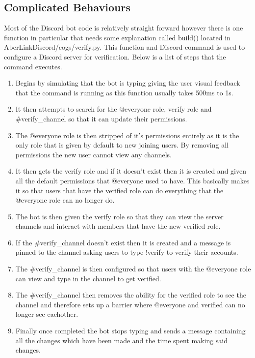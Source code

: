 \subsection{Complicated Behaviours}
Most of the Discord bot code is relatively straight forward however there is one function in particular that needs some explanation called build() located in AberLinkDiscord/cogs/verify.py. This function and Discord command is used to configure a Discord server for verification. Below is a list of steps that the command executes.

\begin{enumerate}
	\item Begins by simulating that the bot is typing giving the user visual feedback that the command is running as this function usually takes 500ms to 1s.
	\item It then attempts to search for the @everyone role, verify role and \#verify\_channel so that it can update their permissions.
	\item The @everyone role is then stripped of it's permissions entirely as it is the only role that is given by default to new joining users. By removing all permissions the new user cannot view any channels.
	\item It then gets the verify role and if it doesn't exist then it is created and given all the default permissions that @everyone used to have. This basically makes it so that users that have the verified role can do everything that the @everyone role can no longer do.
	\item The bot is then given the verify role so that they can view the server channels and interact with members that have the new verified role.
	\item If the \#verify\_channel doesn't exist then it is created and a message is pinned to the channel asking users to type !verify to verify their accounts.
	\item The \#verify\_channel is then configured so that users with the @everyone role can view and type in the channel to get verified.
	\item The \#verify\_channel then removes the ability for the verified role to see the channel and therefore sets up a barrier where @everyone and verified can no longer see eachother.
	\item Finally once completed the bot stops typing and sends a message containing all the changes which have been made and the time spent making said changes.
\end{enumerate}

